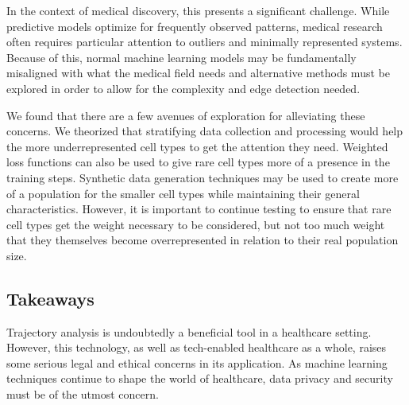 \documentclass{article}
\begin{document}
In the context of medical discovery, this presents a significant challenge. While predictive models optimize for frequently observed patterns, medical research often requires particular attention to outliers and minimally represented systems. Because of this, normal machine learning models may be fundamentally misaligned with what the medical field needs and alternative methods must be explored in order to allow for the complexity and edge detection needed.

We found that there are a few avenues of exploration for alleviating these concerns. We theorized that stratifying data collection and processing would help the more underrepresented cell types to get the attention they need. Weighted loss functions can also be used to give rare cell types more of a presence in the training steps. Synthetic data generation techniques may be used to create more of a population for the smaller cell types while maintaining their general characteristics. However, it is important to continue testing to ensure that rare cell types get the weight necessary to be considered, but not too much weight that they themselves become overrepresented in relation to their real population size. 


\subsection{Takeaways}
Trajectory analysis is undoubtedly a beneficial tool in a healthcare setting.  However, this technology, as well as tech-enabled healthcare as a whole, raises some serious legal and ethical concerns in its application.  As machine learning techniques continue to shape the world of healthcare, data privacy and security must be of the utmost concern.
\end{document}
